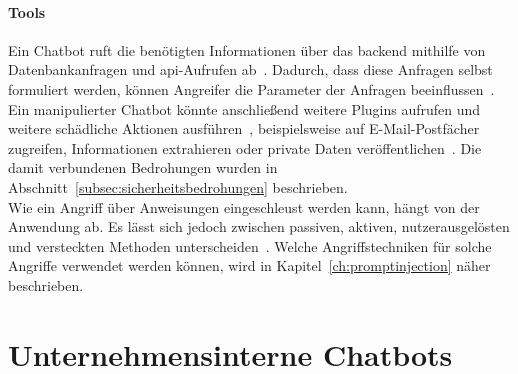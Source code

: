 \paragraph{Tools}

Ein Chatbot ruft die benötigten Informationen über das \gls{backend} mithilfe von Datenbankanfragen und \ac{api}-Aufrufen ab~\cite[10]{cb11}. Dadurch, dass diese Anfragen 
selbst formuliert werden, können Angreifer die Parameter der Anfragen beeinflussen~\cite[10]{cb09}.
Ein manipulierter Chatbot könnte anschließend weitere Plugins aufrufen und weitere schädliche Aktionen ausführen~\cite[2]{sm08}, beispielsweise auf E-Mail-Postfächer 
zugreifen, Informationen extrahieren oder private Daten veröffentlichen~\cite[2]{sm08}.
Die damit verbundenen Bedrohungen wurden in Abschnitt~\ref{subsec:sicherheitsbedrohungen} beschrieben. \\
Wie ein Angriff über Anweisungen eingeschleust werden kann, hängt von der Anwendung ab. Es lässt sich jedoch zwischen passiven, aktiven, nutzerausgelösten und 
versteckten Methoden 
unterscheiden~\cite[3\psq]{cb09}. Welche Angriffstechniken für solche Angriffe verwendet werden können, wird in Kapitel~\ref{ch:promptinjection} näher beschrieben.

\section{Unternehmensinterne Chatbots}

